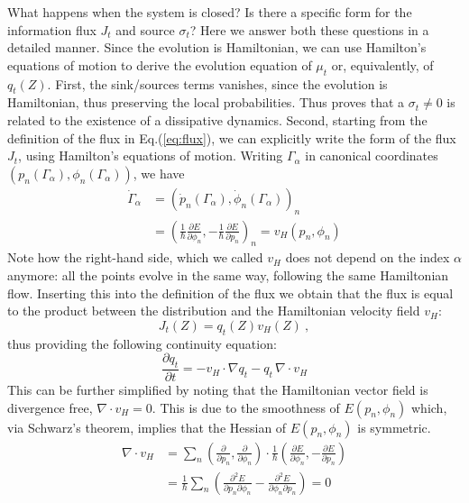 \documentclass[draft,nofootinbib,pre,twocolumn,showpacs,showkeys,preprintnumbers,floatfix]{revtex4-1}
\newcommand{\1}{\mathbbm{1}}
\newcommand{\p}{\partial}
\begin{document}
What happens when the system is closed? Is there a specific form for the information flux $J_t$ and source $\sigma_t$?
Here we answer both these questions in a detailed manner. Since the evolution is Hamiltonian, we can 
use Hamilton's equations of motion to derive the evolution equation of $\mu_t$ or, equivalently, of $q_t(Z)$.
First, the sink/sources terms vanishes, since the evolution is Hamiltonian, thus preserving the local probabilities.
Thus proves that a $\sigma_t \neq 0$ is related to the existence of a dissipative dynamics. Second, starting from 
the definition of the flux in Eq.(\ref{eq:flux}), we can explicitly write the form of the flux $J_t$, 
using Hamilton's equations of motion. Writing $\Gamma_\alpha$ in canonical coordinates $(p_n(\Gamma_\alpha),\phi_n(\Gamma_\alpha))$, 
we have 
\begin{align}
\dot{\Gamma}_\alpha & = \left( \dot{p}_n(\Gamma_\alpha), \dot{\phi}_n(\Gamma_\alpha)\right)_n \nonumber \\
& = \left( \frac{1}{\hbar}\frac{\partial E}{\partial \phi_n}, -\frac{1}{\hbar}\frac{\partial E}{\partial p_n}  \right)_n = v_H(p_n,\phi_n)
\end{align}
Note how the right-hand side, which we called $v_H$ does not depend on the index $\alpha$ anymore: all 
the points evolve in the same way, following the same Hamiltonian flow. Inserting this into the definition of the flux 
we obtain that the flux is equal to the product between the distribution and the Hamiltonian velocity field $v_H$:
\begin{equation}
J_t(Z) = q_t(Z) v_H(Z)~,
\end{equation}
thus providing the following continuity equation:
\begin{equation}
\frac{\partial q_t}{\partial t} = - v_H \cdot \nabla q_t - q_t \, \nabla \cdot v_H
\end{equation}
This can be further simplified by noting that the Hamiltonian vector field is divergence free, $\nabla \cdot v_H = 0$.
This is due to the smoothness of $E(p_n,\phi_n)$ which, via Schwarz's theorem, implies that the Hessian of $E(p_n,\phi_n)$ 
is symmetric. 
\begin{align}
\nabla \cdot v_H &= \sum_n \left( \frac{\partial}{\partial p_n} , \frac{\partial}{\partial \phi_n}\right) \cdot \frac{1}{\hbar}\left(\frac{\p E}{\p \phi_n}, -\frac{\p E}{\p p_n} \right) \nonumber \\
& = \frac{1}{\hbar} \sum_n \left( \frac{\p^2 E}{\p p_n \p \phi_n } - \frac{\p^2 E}{\p \phi_n \p p_n }\right) = 0 \nonumber
\end{align}
\end{document}
